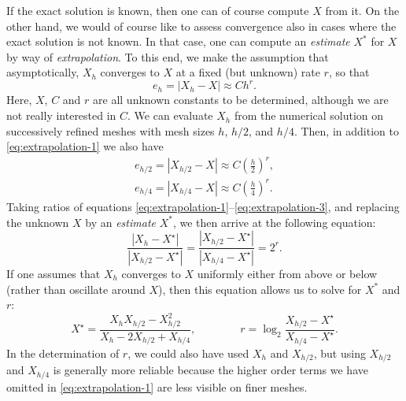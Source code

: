 If the exact solution is known, then one can of course compute $X$ from it.
On the other hand, we would of course like to assess convergence also in
cases where the exact solution is not known. In that case, one can compute
an \textit{estimate} $X^\ast$ for $X$ by way of \textit{extrapolation}.
To this end, we make the assumption that asymptotically, $X_h$ converges to
$X$ at a fixed (but unknown) rate $r$, so that
\begin{equation}
  \label{eq:extrapolation-1}
  e_h=|X_h-X| \approx C h^r.
\end{equation}
Here, $X$, $C$ and $r$ are all unknown constants to be determined, although
we are not really interested in $C$.
We can evaluate $X_h$ from the numerical solution
on successively refined meshes with mesh sizes $h$, $h/2$, and $h/4$. Then,
in addition to \eqref{eq:extrapolation-1} we also have
\begin{eqnarray}
  \label{eq:extrapolation-2}
  e_{h/2}=|X_{h/2}-X| \approx C \left(\frac h2\right)^r,
  \\
  \label{eq:extrapolation-3}
  e_{h/4} =|X_{h/4}-X| \approx C \left(\frac h4\right)^r.
\end{eqnarray}
Taking ratios of equations \eqref{eq:extrapolation-1}--\eqref{eq:extrapolation-3},
and replacing the unknown $X$ by an \textit{estimate} $X^\ast$, we then
arrive at the following equation:
\begin{equation*}
\frac{|X_h-X^\star|}{|X_{h/2}-X^\star|}
=
\frac{|X_{h/2}-X^\star|}{|X_{h/4}-X^\star|}=2^r.
\end{equation*}
If one assumes that $X_h$ converges to $X$ uniformly either from above or
below (rather than oscillate around $X$), then this equation allows us
to solve for $X^\ast$ and $r$:
\begin{equation*}
X^\star = \frac{X_h X_{h/2}-X_{h/2}^2}{X_h - 2 X_{h/2} + X_{h/4}}, \qquad\qquad
r = \log_2 \frac{X_{h/2}-X^\star}{X_{h/4}-X^\star}.
\end{equation*}
In the determination of $r$, we could also have used $X_h$ and $X_{h/2}$,
but using $X_{h/2}$ and $X_{h/4}$ is generally more reliable because
the higher order terms we have omitted in \eqref{eq:extrapolation-1} are less
visible on finer meshes.


